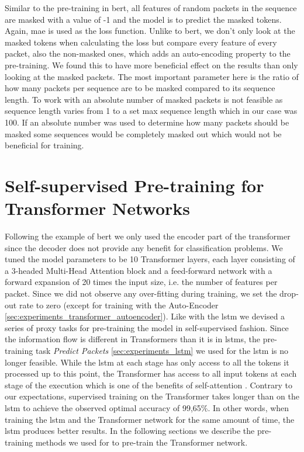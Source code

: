 Similar to the pre-training in \gls{bert}, all features of random packets in the sequence are masked with a value of -1 and the model is to predict the masked tokens. Again, \gls{mae} is used as the loss function. Unlike to \gls{bert}, we don't only look at the masked tokens when calculating the loss but compare every feature of every packet, also the non-masked ones, which adds an auto-encoding property to the pre-training. We found this to have more beneficial effect on the results than only looking at the masked packets. The most important parameter here is the ratio of how many packets per sequence are to be masked compared to its sequence length. To work with an absolute number of masked packets is not feasible as sequence length varies from 1 to a set max sequence length which in our case was 100. If an absolute number was used to determine how many packets should be masked some sequences would be completely masked out which would not be beneficial for training.

\section{Self-supervised Pre-training for Transformer Networks} \label{sec:experiments_transformer}

Following the example of \gls{bert} we only used the encoder part of the transformer since the decoder does not provide any benefit for classification problems. We tuned the model parameters to be 10 Transformer layers, each layer consisting of a 3-headed Multi-Head Attention block and a feed-forward network with a forward expansion of 20 times the input size, i.e. the number of features per packet. Since we did not observe any over-fitting during training, we set the drop-out rate to zero (except for training with the Auto-Encoder \ref{sec:experiments_transformer_autoencoder}). 
Like with the \gls{lstm} we devised a series of proxy tasks for pre-training the model in self-supervised fashion. Since the information flow is different in Transformers than it is in \glspl{lstm}, the pre-training task \textit{Predict Packets} \ref{sec:experiments_lstm} we used for the \gls{lstm} is no longer feasible. While the \gls{lstm} at each stage has only access to all the tokens it processed up to this point, the Transformer has access to all input tokens at each stage of the execution which is one of the benefits of self-attention \cite{attention}. Contrary to our expectations, supervised training on the Transformer takes longer than on the \gls{lstm} to achieve the observed optimal accuracy of 99,65\%. In other words, when training the \gls{lstm} and the Transformer network for the same amount of time, the \gls{lstm} produces better results. In the following sections we describe the pre-training methods we used for to pre-train the Transformer network.

